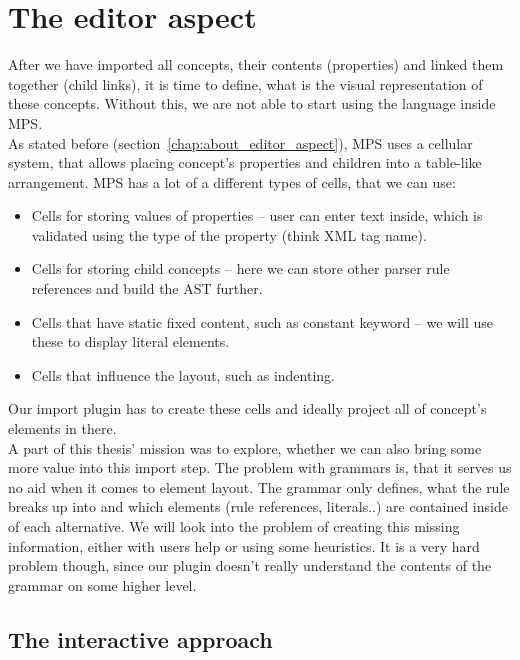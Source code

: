 \section{The editor aspect}
\label{chap:editor_aspect}
After we have imported all concepts, their contents (properties) and linked them together (child links), it is time to define, what is the visual representation of these concepts.
Without this, we are not able to start using the language inside MPS.
\\

As stated before (section~\ref{chap:about_editor_aspect}), MPS uses a cellular system, that allows placing concept's properties and children into a table-like arrangement.
MPS has a lot of a different types of cells, that we can use:

\begin{itemize}
	\item Cells for storing values of properties -- user can enter text inside, which is validated using the type of the property (think XML tag name).
	
	\item Cells for storing child concepts -- here we can store other parser rule references and build the AST further.
	
	\item Cells that have static fixed content, such as constant keyword -- we will use these to display literal elements.
	
	\item Cells that influence the layout, such as indenting.
\end{itemize}

Our import plugin has to create these cells and ideally project all of concept's elements in there.
\\

A part of this thesis' mission was to explore, whether we can also bring some more value into this import step.
The problem with grammars is, that it serves us no aid when it comes to element layout.
The grammar only defines, what the rule breaks up into and which elements (rule references, literals..) are contained inside of each alternative.
We will look into the problem of creating this missing information, either with users help or using some heuristics.
It is a very hard problem though, since our plugin doesn't really understand the contents of the grammar on some higher level.

\subsection{The interactive approach}

